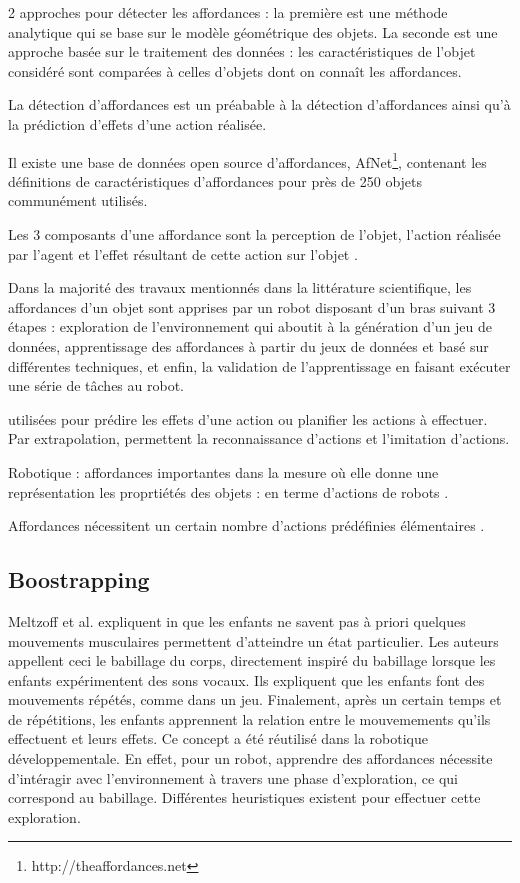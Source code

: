 \documentclass[draft]{llncs}
\begin{document}
2 approches pour détecter les affordances : la première est une méthode analytique qui se base sur le modèle géométrique des objets.
La seconde est une approche basée sur le traitement des données : les caractéristiques de l'objet considéré sont comparées à celles d'objets dont on connaît les affordances.

La détection d'affordances est un préabable à la détection d'affordances \cite{Jamone2016} ainsi qu'à la prédiction d'effets d'une action réalisée.

Il existe une base de données open source d'affordances, AfNet\footnote{http://theaffordances.net}, contenant les définitions de caractéristiques d'affordances pour près de 250 objets communément utilisés. 

Les 3 composants d'une affordance sont la perception de l'objet, l'action réalisée par l'agent et l'effet résultant de cette action sur l'objet \cite{Sahin2007}.

Dans la majorité des travaux mentionnés dans la littérature scientifique, les affordances d'un objet sont apprises par un robot disposant d'un bras suivant 3 étapes : exploration de l'environnement qui aboutit à la génération d'un jeu de données, apprentissage des affordances à partir du jeux de données et basé sur différentes techniques, et enfin, la validation de l'apprentissage en faisant exécuter une série de tâches au robot.

utilisées pour prédire les effets d'une action ou planifier les actions à effectuer.
Par extrapolation, permettent la reconnaissance d'actions et l'imitation d'actions.

Robotique : affordances importantes dans la mesure où elle donne une représentation les proprtiétés des objets : en terme d'actions de robots \cite{Montesano2008}. 

Affordances nécessitent un certain nombre d'actions prédéfinies élémentaires \cite{Montesano2008}.




\subsection{Boostrapping}

Meltzoff et al. expliquent in \cite{EDP:EDP157} que les enfants ne savent pas à priori quelques mouvements musculaires permettent d'atteindre un état particulier. Les auteurs appellent ceci le babillage du corps, directement inspiré du babillage lorsque les enfants expérimentent des sons vocaux.
Ils expliquent que les enfants font des mouvements répétés, comme dans un jeu.
Finalement, après un certain temps et de répétitions, les enfants apprennent la relation entre le mouvemements qu'ils effectuent et leurs effets.
Ce concept a été réutilisé dans la robotique développementale.
En effet, pour un robot, apprendre des affordances nécessite d'intéragir avec l'environnement à travers une phase d'exploration, ce qui correspond au babillage. Différentes heuristiques existent pour effectuer cette exploration.
\end{document}
